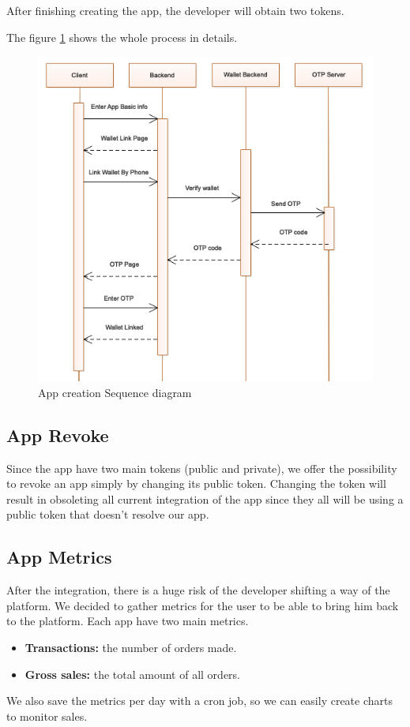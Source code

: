 \begin{spacing}{1.2}
After finishing creating the app, the developer will obtain two tokens.

The figure \ref{fig:appcreate} shows the whole process in details.
\begin{figure}[H]\centering
\includegraphics[scale=0.7]{Create_App_Sequence_Diagram.png}
\caption{App creation Sequence diagram}
\label{fig:appcreate}
\end{figure}
\subsection{App Revoke}
Since the app have two main tokens (public and private), we offer the possibility to revoke an app simply by changing its public token. Changing the token will result in obsoleting all current integration of the app since they all will be using a public token that doesn't resolve our app.

\subsection{App Metrics}
After the integration, there is a huge  risk of the developer shifting a way of the platform. We decided to gather metrics for the user to be able to bring him back to the platform.
Each app have two main metrics.
\begin{itemize}
	\item \textbf{Transactions:} the number of orders made.
	\item \textbf{Gross sales:} the total amount of all orders.
\end{itemize}
We also save the metrics per day with a cron job, so we can easily create charts to monitor sales.


\end{spacing}
